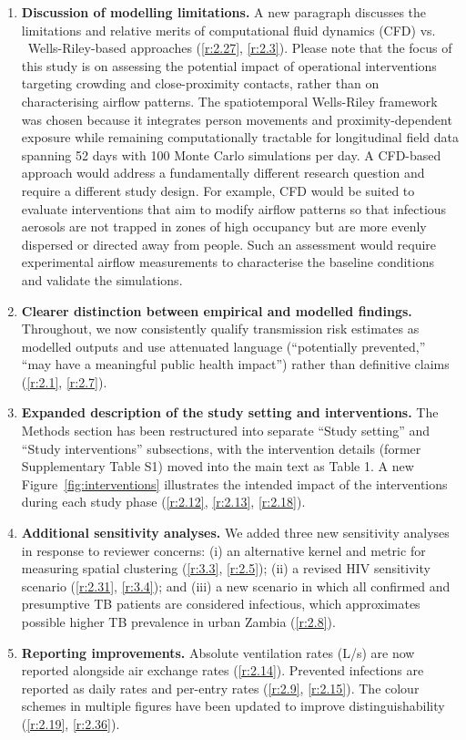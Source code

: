 \documentclass[11pt]{article}
\begin{document}
\begin{enumerate}
\item \textbf{Discussion of modelling limitations.} A new paragraph discusses the limitations and relative merits of computational fluid dynamics (CFD) vs. \ Wells-Riley-based approaches (\ref{r:2.27}, \ref{r:2.3}). Please note that the focus of this study is on assessing the potential impact of operational interventions targeting crowding and close-proximity contacts, rather than on characterising airflow patterns. The spatiotemporal Wells-Riley framework was chosen because it integrates person movements and proximity-dependent exposure while remaining computationally tractable for longitudinal field data spanning 52 days with 100 Monte Carlo simulations per day. A CFD-based approach would address a fundamentally different research question and require a different study design. For example, CFD would be suited to evaluate interventions that aim to modify airflow patterns so that infectious aerosols are not trapped in zones of high occupancy but are more evenly dispersed or directed away from people. Such an assessment would require experimental airflow measurements to characterise the baseline conditions and validate the simulations.

\item \textbf{Clearer distinction between empirical and modelled findings.} Throughout, we now consistently qualify transmission risk estimates as modelled outputs and use attenuated language (``potentially prevented,'' ``may have a meaningful public health impact'') rather than definitive claims (\ref{r:2.1}, \ref{r:2.7}).

\item \textbf{Expanded description of the study setting and interventions.} The Methods section has been restructured into separate ``Study setting'' and ``Study interventions'' subsections, with the intervention details (former Supplementary Table S1) moved into the main text as Table 1. A new Figure~\ref{fig:interventions} illustrates the intended impact of the interventions during each study phase (\ref{r:2.12}, \ref{r:2.13}, \ref{r:2.18}).

\item \textbf{Additional sensitivity analyses.} We added three new sensitivity analyses in response to reviewer concerns: (i) an alternative kernel and metric for measuring spatial clustering (\ref{r:3.3}, \ref{r:2.5}); (ii) a revised HIV sensitivity scenario (\ref{r:2.31}, \ref{r:3.4}); and (iii) a new scenario in which all confirmed and presumptive TB patients are considered infectious, which approximates possible higher TB prevalence in urban Zambia (\ref{r:2.8}).

\item \textbf{Reporting improvements.} Absolute ventilation rates (L/s) are now reported alongside air exchange rates (\ref{r:2.14}). Prevented infections are reported as daily rates and per-entry rates (\ref{r:2.9}, \ref{r:2.15}). The colour schemes in multiple figures have been updated to improve distinguishability (\ref{r:2.19}, \ref{r:2.36}).
\end{enumerate}
\end{document}
